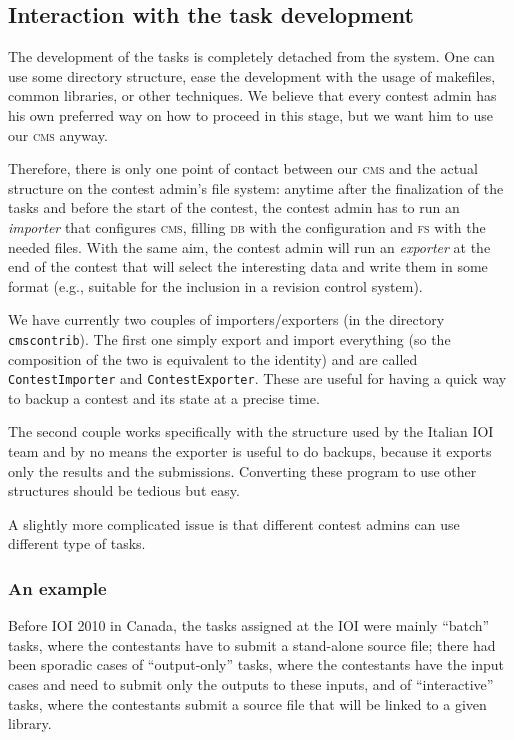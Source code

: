 \documentclass[a4paper,8pt]{amsart}
\newcommand{\CMS}{\textsc{cms}}
\newcommand{\DB}{\textsc{db}}
\newcommand{\FS}{\textsc{fs}}
\newcommand{\file}[1]{\texttt{#1}}
\begin{document}
\begin{multicols}{2}
  \subsection{Interaction with the task development}

  The development of the tasks is completely detached from the
  system. One can use some directory structure, ease the development
  with the usage of makefiles, common libraries, or other
  techniques. We believe that every contest admin has his own
  preferred way on how to proceed in this stage, but we want him to
  use our \CMS{} anyway.

  Therefore, there is only one point of contact between our \CMS{} and
  the actual structure on the contest admin's file system: anytime
  after the finalization of the tasks and before the start of the
  contest, the contest admin has to run an \emph{importer\/} that
  configures \CMS{}, filling \DB{} with the configuration and \FS{}
  with the needed files. With the same aim, the contest admin will run
  an \emph{exporter\/} at the end of the contest that will select the
  interesting data and write them in some format (e.g., suitable for
  the inclusion in a revision control system).

  We have currently two couples of importers/exporters (in the
  directory \file{cmscontrib}). The first one simply export and import
  everything (so the composition of the two is equivalent to the
  identity) and are called \file{ContestImporter} and
  \file{ContestExporter}. These are useful for having a quick way to
  backup a contest and its state at a precise time.

  The second couple works specifically with the structure used by the
  Italian IOI team and by no means the exporter is useful to do
  backups, because it exports only the results and the submissions.
  Converting these program to use other structures should be tedious
  but easy.

  A slightly more complicated issue is that different contest admins
  can use different type of tasks.

  \subsubsection{An example}

  Before IOI 2010 in Canada, the tasks assigned at the IOI were mainly
  ``batch'' tasks, where the contestants have to submit a stand-alone
  source file; there had been sporadic cases of ``output-only'' tasks,
  where the contestants have the input cases and need to submit only
  the outputs to these inputs, and of ``interactive'' tasks, where the
  contestants submit a source file that will be linked to a given
  library.


\end{multicols}
\end{document}
